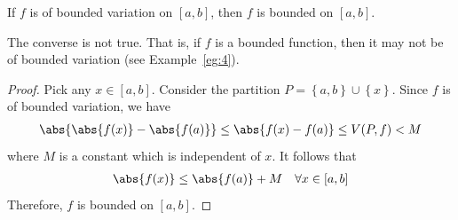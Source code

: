 \documentclass[thmcnt=section, 12pt]{elegantbook}
\begin{document}

\begin{theorem} \label{thm:30}
    If $f$ is of bounded variation on $[a, b]$, then $f$ is bounded on $[a, b]$.
\end{theorem}

\begin{remark}
    The converse is not true. That is, if $f$ is a bounded function, then it may not be of bounded variation (see Example~\ref{eg:4}).
\end{remark}

\begin{proof}
    Pick any $x \in [a, b]$. Consider the partition $P = \left\{a, b\right\} \cup \left\{x\right\}$. Since $f$ is of bounded variation, we have 
    \begin{align*}
        \abs{\abs{f(x)} - \abs{f(a)}}
        \leq \abs{f(x) - f(a)}
        \leq V(P, f)
        < M
    \end{align*}
    where $M$ is a constant which is independent of $x$. It follows that 
    \begin{align*}
        \abs{f(x)} \leq \abs{f(a)} + M
        \quad \forall x \in [a, b]
    \end{align*}
    Therefore, $f$ is bounded on $[a, b]$.
\end{proof}
\end{document}
